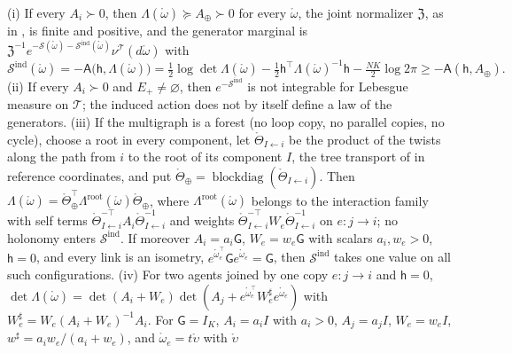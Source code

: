 (i) If every \(A_i\succ0\), then \(\Lambda(\mathring\omega)\succeq A_\oplus\succ0\) for every
\(\mathring\omega\), the joint normalizer \(\mathfrak Z\), as in , is finite
and positive, and the generator marginal is
\(\mathfrak Z^{-1}e^{-\mathscr S(\mathring\omega)-\mathscr S^{\mathrm{ind}}(\mathring\omega)}\nu^{\mathscr T}(d\mathring\omega)\) with
\begin{equation}
\mathscr S^{\mathrm{ind}}(\mathring\omega)=-\mathsf A\bigl(\mathsf h,\Lambda(\mathring\omega)\bigr)
=\tfrac12\log\det\Lambda(\mathring\omega)-\tfrac12\mathsf h^\top\Lambda(\mathring\omega)^{-1}\mathsf h-\tfrac{NK}2\log2\pi
\geq-\mathsf A(\mathsf h,A_\oplus).
\label{eq:glink-induced-action}
\end{equation}
(ii) If every \(A_i\succ0\) and \(E_+\neq\varnothing\), then \(e^{-\mathscr S^{\mathrm{ind}}}\) is not
integrable for Lebesgue measure on \(\mathscr T\); the induced action does not by itself define a law
of the generators.
(iii) If the multigraph is a forest (no loop copy, no parallel copies, no cycle), choose a root in
every component, let \(\mathring\Theta_{I\leftarrow i}\) be the product of the twists along the path from \(i\)
to the root of its component \(I\), the tree transport of  in reference
coordinates, and put \(\mathring\Theta_\oplus=\operatorname{blockdiag}(\mathring\Theta_{I\leftarrow i})\). Then
\(\Lambda(\mathring\omega)=\mathring\Theta_\oplus^\top\Lambda^{\mathrm{root}}(\mathring\omega)\mathring\Theta_\oplus\), where
\(\Lambda^{\mathrm{root}}(\mathring\omega)\) belongs to the interaction family with self terms
\(\mathring\Theta_{I\leftarrow i}^{-\top}A_i\mathring\Theta_{I\leftarrow i}^{-1}\) and weights
\(\mathring\Theta_{I\leftarrow i}^{-\top}W_e\mathring\Theta_{I\leftarrow i}^{-1}\) on \(e:j\to i\); no holonomy
enters \(\mathscr S^{\mathrm{ind}}\). If moreover \(A_i=a_i\mathsf G\), \(W_e=w_e\mathsf G\) with scalars
\(a_i,w_e>0\), \(\mathsf h=0\), and every link is an isometry,
\(e^{\mathring\omega_e^\top}\mathsf Ge^{\mathring\omega_e}=\mathsf G\), then \(\mathscr S^{\mathrm{ind}}\)
takes one value on all such configurations.
(iv) For two agents joined by one copy \(e:j\to i\) and \(\mathsf h=0\),
\(\det\Lambda(\mathring\omega)=\det(A_i+W_e)\det(A_j+e^{\mathring\omega_e^\top}W_e^\sharp e^{\mathring\omega_e})\)
with \(W_e^\sharp=W_e(A_i+W_e)^{-1}A_i\). For \(\mathsf G=I_K\), \(A_i=a_iI\) with \(a_i>0\), \(A_j=a_jI\),
\(W_e=w_eI\), \(w^\sharp=a_iw_e/(a_i+w_e)\), and \(\mathring\omega_e=t\mathring\upsilon\) with \(\mathring\upsilon\)
